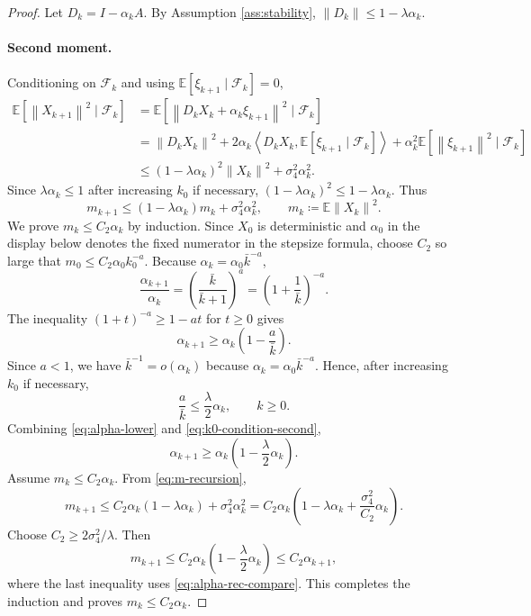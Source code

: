 \documentclass[10pt,a4paper]{amsart}
\newcommand{\E}{\mathbb{E}}
\newcommand{\ip}[2]{\left\langle #1,#2\right\rangle}
\newcommand{\norm}[1]{\left\lVert #1\right\rVert}
\begin{document}
\begin{proof}
Let $D_k=I-\alpha_kA$. By Assumption \ref{ass:stability}, $\norm{D_k}\le1-\lambda\alpha_k$.

\paragraph{Second moment.}
Conditioning on $\mathcal F_k$ and using $\E[\xi_{k+1}\mid\mathcal F_k]=0$,
\[
\begin{aligned}
  \E[\norm{X_{k+1}}^2\mid\mathcal F_k]
  &=\E[\norm{D_kX_k+\alpha_k\xi_{k+1}}^2\mid\mathcal F_k]\\
  &=\norm{D_kX_k}^2
    +2\alpha_k\ip{D_kX_k}{\E[\xi_{k+1}\mid\mathcal F_k]}
    +\alpha_k^2\E[\norm{\xi_{k+1}}^2\mid\mathcal F_k]\\
  &\le (1-\lambda\alpha_k)^2\norm{X_k}^2+\sigma_4^2\alpha_k^2.
\end{aligned}
\]
Since $\lambda\alpha_k\le1$ after increasing $k_0$ if necessary, $(1-\lambda\alpha_k)^2\le1-\lambda\alpha_k$. Thus
\begin{equation}
  m_{k+1}\le (1-\lambda\alpha_k)m_k+\sigma_4^2\alpha_k^2,\qquad
  m_k\coloneqq \E\norm{X_k}^2. \label{eq:m-recursion}
\end{equation}
We prove $m_k\le C_2\alpha_k$ by induction. Since $X_0$ is deterministic and $\alpha_0$ in the display below denotes the fixed numerator in the stepsize formula, choose $C_2$ so large that $m_0\le C_2\alpha_0 k_0^{-a}$. Because $\alpha_k=\alpha_0\bar k^{-a}$,
\[
  \frac{\alpha_{k+1}}{\alpha_k}=\left(\frac{\bar k}{\bar k+1}\right)^a
  =\left(1+\frac1{\bar k}\right)^{-a}.
\]
The inequality $(1+t)^{-a}\ge1-at$ for $t\ge0$ gives
\begin{equation}
  \alpha_{k+1}\ge \alpha_k\left(1-\frac{a}{\bar k}\right). \label{eq:alpha-lower}
\end{equation}
Since $a<1$, we have $\bar k^{-1}=o(\alpha_k)$ because $\alpha_k=\alpha_0\bar k^{-a}$. Hence, after increasing $k_0$ if necessary,
\begin{equation}
  \frac{a}{\bar k}\le \frac{\lambda}{2}\alpha_k,
  \qquad k\ge0. \label{eq:k0-condition-second}
\end{equation}
Combining \eqref{eq:alpha-lower} and \eqref{eq:k0-condition-second},
\begin{equation}
  \alpha_{k+1}\ge \alpha_k\left(1-\frac{\lambda}{2}\alpha_k\right). \label{eq:alpha-rec-compare}
\end{equation}
Assume $m_k\le C_2\alpha_k$. From \eqref{eq:m-recursion},
\[
  m_{k+1}\le C_2\alpha_k(1-\lambda\alpha_k)+\sigma_4^2\alpha_k^2
  =C_2\alpha_k\left(1-\lambda\alpha_k+\frac{\sigma_4^2}{C_2}\alpha_k\right).
\]
Choose $C_2\ge 2\sigma_4^2/\lambda$. Then
\[
  m_{k+1}\le C_2\alpha_k\left(1-\frac{\lambda}{2}\alpha_k\right)
  \le C_2\alpha_{k+1},
\]
where the last inequality uses \eqref{eq:alpha-rec-compare}. This completes the induction and proves $m_k\le C_2\alpha_k$.


\end{proof}
\end{document}
